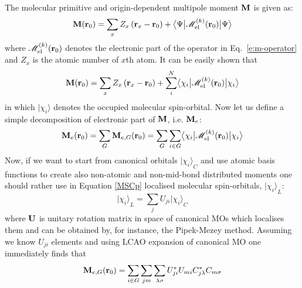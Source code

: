 \documentclass[b5paper,oneside,fleqn,11pt]{book}
\newcommand{\ket}[1]{\ensuremath{\bigr\rvert {#1} \bigr\rangle}}
\newcommand{\tbraket}[3]{\ensuremath{\bigl\langle {#1} \bigl\lvert {#2} \bigl\lvert {#3} \bigr\rangle}}
\begin{document}
\begin{appendices}
\begin{refsection}
The molecular primitive and origin\hyp{}dependent multipole moment $\bf M$
is given as:
%
\begin{equation}\label{M}
{\bf M} ({\bf r}_0) = \sum_x Z_x\left({\bf r}_x - {\bf r}_0 \right)  
                    + \tbraket{\Psi}{\mathscr{M}^{(k)}_{\rm el}({\bf r}_0) }{\Psi}
\end{equation}
%
%
%
where $\mathscr{M}^{(k)}_{\rm el}({\bf r}_0)$ denotes the electronic
part of the operator in Eq.~\eqref{e:m-operator} and
$Z_x$ is the atomic number of $x$th atom.
It can be easily shown that
%
\begin{equation}\label{MSC}
{\bf M}({\bf r}_0) = \sum_x Z_x\left({\bf r}_x - {\bf r}_0 \right) 
                   + \sum_i^N \tbraket{\chi_i}{\mathscr{M}^{(k)}_{\rm el}({\bf r}_0)}{\chi_i}
\end{equation}
%
in which $\ket{\chi_i}$ denotes the occupied molecular spin\hyp{}orbital.
Now let us define a simple decomposition of electronic part of $\bf M$, i.e. ${\bf M}_e$:
%
\begin{equation}\label{MSCp}
{\bf M}_e({\bf r}_0) = \sum_G {\bf M}_{e,G}({\bf r}_0) 
                     = \sum_G \sum_{i \in G} \tbraket{\chi_i}{\mathscr{M}^{(k)}_{\rm el}({\bf r}_0)}{\chi_i}
\end{equation}
%
Now, if we want to start from canonical orbitals $\ket{\chi_i}_C$ and use atomic basis functions to create also
non\hyp{}atomic and non\hyp{}mid\hyp{}bond distributed moments one should rather use in Equation \eqref{MSCp} localised
molecular spin\hyp{}orbitals, $\ket{\chi_i}_L$:
%
\begin{equation}\label{a}
\ket{\chi_i}_L = \sum_j U_{ji} \ket{\chi_i}_C
\end{equation}
%
where $\bf U$ is unitary rotation matrix in space of canonical MOs which localises them
and can be obtained by, for instance, the Pipek\hyp{}Mezey method. \citep{Pipek.Mezey.JCP.1989}
Assuming we know
$U_{ji}$ elements and using LCAO expansion of canonical MO one immediately finds that
%
\begin{equation}\label{b}
{\bf M}_{e,G}({\bf r}_0) = \sum_{i \in G} \sum_{jm} \sum_{\lambda\sigma} U^*_{ji} U_{mi} C^*_{j\lambda} C_{m\sigma}

\end{equation}
\end{refsection}
\end{appendices}
\end{document}
